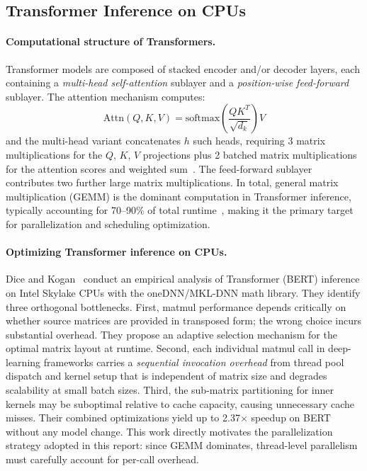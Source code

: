 \documentclass[11pt,english]{article}
\begin{document}
    \subsection{Transformer Inference on CPUs}

    \paragraph{Computational structure of Transformers.}
    Transformer models are composed of stacked encoder and/or decoder layers, each containing a \emph{multi-head self-attention} sublayer and a \emph{position-wise feed-forward} sublayer. The attention mechanism computes:
    \[
        \text{Attn}(Q, K, V) = \text{softmax}\!\left(\frac{QK^T}{\sqrt{d_k}}\right)V
    \]
    and the multi-head variant concatenates $h$ such heads, requiring 3 matrix multiplications for the $Q$, $K$, $V$ projections plus 2 batched matrix multiplications for the attention scores and weighted sum~\cite{dice2021transformercpu}. The feed-forward sublayer contributes two further large matrix multiplications. In total, general matrix multiplication (GEMM) is the dominant computation in Transformer inference, typically accounting for 70--90\% of total runtime~\cite{dice2021transformercpu}, making it the primary target for parallelization and scheduling optimization.

    \paragraph{Optimizing Transformer inference on CPUs.}
    Dice and Kogan~\cite{dice2021transformercpu} conduct an empirical analysis of Transformer (BERT) inference on Intel Skylake CPUs with the oneDNN/MKL-DNN math library. They identify three orthogonal bottlenecks. First, matmul performance depends critically on whether source matrices are provided in transposed form; the wrong choice incurs substantial overhead. They propose an adaptive selection mechanism for the optimal matrix layout at runtime. Second, each individual matmul call in deep-learning frameworks carries a \emph{sequential invocation overhead} from thread pool dispatch and kernel setup that is independent of matrix size and degrades scalability at small batch sizes. Third, the sub-matrix partitioning for inner kernels may be suboptimal relative to cache capacity, causing unnecessary cache misses. Their combined optimizations yield up to 2.37$\times$ speedup on BERT without any model change. This work directly motivates the parallelization strategy adopted in this report: since GEMM dominates, thread-level parallelism must carefully account for per-call overhead.
 
\end{document}
